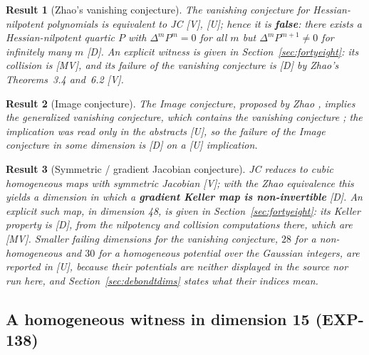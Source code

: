 \documentclass[11pt]{article}
\newtheorem{corollary}{Result}
\theoremstyle{remark}
\begin{document}
\begin{corollary}[Zhao's vanishing conjecture]
The vanishing conjecture for Hessian-nilpotent polynomials is equivalent to JC \cite[Theorem~7.2, p.~30]{Zhao2004} [V], \cite[abstract, p.~1]{Zhao2007} [U]; hence it is \textbf{false}: there exists a Hessian-nilpotent quartic $P$ with $\Delta^m P^m = 0$ for all $m$ but $\Delta^m P^{m+1} \ne 0$ for infinitely many $m$ [D]. An explicit witness is given in Section~\ref{sec:fortyeight}: its collision is [MV], and its failure of the vanishing conjecture is [D] by Zhao's Theorems~3.4 and~6.2 \cite[pp.~12 and~25]{Zhao2004} [V].
\end{corollary}

\begin{corollary}[Image conjecture]
The Image conjecture, proposed by Zhao \cite[abstract, p.~1]{Zhao2010}, implies the generalized vanishing conjecture, which contains the vanishing conjecture \cite[abstract, p.~1]{vdE2010}; the implication was read only in the abstracts [U], so the failure of the Image conjecture in some dimension is [D] on a [U] implication.
\end{corollary}

\begin{corollary}[Symmetric / gradient Jacobian conjecture]
JC reduces to cubic homogeneous maps with symmetric Jacobian \cite[Corollary~1.3, p.~2203]{dBvdE2005} [V]; with the Zhao equivalence this yields a dimension in which a \textbf{gradient Keller map is non-invertible} [D]. An explicit such map, in dimension 48, is given in Section~\ref{sec:fortyeight}: its Keller property is [D], from the nilpotency and collision computations there, which are [MV]. Smaller failing dimensions for the vanishing conjecture, $28$ for a non-homogeneous and $30$ for a homogeneous potential over the Gaussian integers, are reported in \cite[abstract, p.~1; Introduction, p.~4; table, p.~29]{deBondt2026} [U], because their potentials are neither displayed in the source nor run here, and Section~\ref{sec:debondtdims} states what their indices mean.
\end{corollary}

\subsection{A homogeneous witness in dimension 15 (EXP-138)}\label{sec:fifteen}
\end{document}
